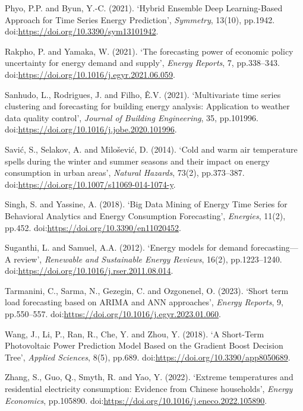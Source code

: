 \documentclass[mstat,12pt]{unswthesis}
\begin{document}
\begin{hangparas}{.25in}{1}
Phyo, P.P. and Byun, Y.-C. (2021). ‘Hybrid Ensemble Deep Learning-Based Approach for Time Series Energy Prediction’, \textit{Symmetry}, 13(10), pp.1942. doi:\url{https://doi.org/10.3390/sym13101942}.  

Rakpho, P. and Yamaka, W. (2021). ‘The forecasting power of economic policy uncertainty for energy demand and supply’, \textit{Energy Reports}, 7, pp.338–343. doi:\url{https://doi.org/10.1016/j.egyr.2021.06.059}.   

Sanhudo, L., Rodrigues, J. and Filho, Ê.V. (2021). ‘Multivariate time series clustering and forecasting for building energy analysis: Application to weather data quality control’, \textit{Journal of Building Engineering}, 35, pp.101996. doi:\url{https://doi.org/10.1016/j.jobe.2020.101996}.  

Savić, S., Selakov, A. and Milošević, D. (2014). ‘Cold and warm air temperature spells during the winter and summer seasons and their impact on energy consumption in urban areas’, \textit{Natural Hazards}, 73(2), pp.373–387. doi:\url{https://doi.org/10.1007/s11069-014-1074-y}.  

Singh, S. and Yassine, A. (2018). ‘Big Data Mining of Energy Time Series for Behavioral Analytics and Energy Consumption Forecasting’, \textit{Energies}, 11(2), pp.452. doi:\url{https://doi.org/10.3390/en11020452}.  

Suganthi, L. and Samuel, A.A. (2012). ‘Energy models for demand forecasting—A review’, \textit{Renewable and Sustainable Energy Reviews}, 16(2), pp.1223–1240. doi:\url{https://doi.org/10.1016/j.rser.2011.08.014}.    

Tarmanini, C., Sarma, N., Gezegin, C. and Ozgonenel, O. (2023). ‘Short term load forecasting based on ARIMA and ANN approaches’, \textit{Energy Reports}, 9, pp.550–557. doi:\url{https://doi.org/10.1016/j.egyr.2023.01.060}.  

Wang, J., Li, P., Ran, R., Che, Y. and Zhou, Y. (2018). ‘A Short-Term Photovoltaic Power Prediction Model Based on the Gradient Boost Decision Tree’, \textit{Applied Sciences}, 8(5), pp.689. doi:\url{https://doi.org/10.3390/app8050689}. 

Zhang, S., Guo, Q., Smyth, R. and Yao, Y. (2022). ‘Extreme temperatures and residential electricity consumption: Evidence from Chinese households’, \textit{Energy Economics}, pp.105890. doi:\url{https://doi.org/10.1016/j.eneco.2022.105890}.  
\end{hangparas}

\newpage
\end{document}
